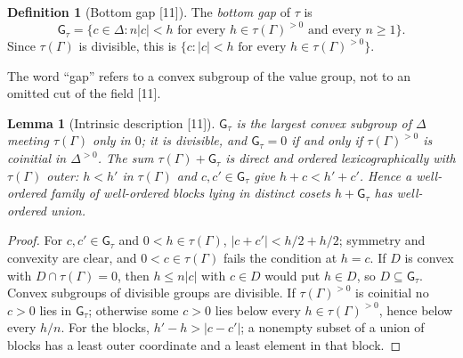 \documentclass[11pt,oneside]{article}
\numberwithin{equation}{section}
\newtheorem{lemma}[lemma]{Lemma}
\theoremstyle{definition}
\newtheorem{definition}[definition]{Definition}
\theoremstyle{remark}
\newcommand{\src}[1]{\textup{\textsf{\small[#1]}}}
\newcommand{\gap}{\mathsf G}
\begin{document}
\begin{definition}[Bottom gap \src{11}]\label{opa:as:def:gap}
The \emph{bottom gap} of $\tau$ is
\[
 \gap_\tau=\{c\in\Delta:n|c|<h\text{ for every }h\in\tau(\Gamma)^{>0}\text{ and every }n\ge1\}.
\]
Since $\tau(\Gamma)$ is divisible, this is $\{c:|c|<h\text{ for every }h\in\tau(\Gamma)^{>0}\}$.
\end{definition}

The word ``gap'' refers to a convex subgroup of the value group, not to an omitted cut of the
field \src{11}.

\begin{lemma}[Intrinsic description \src{11}]\label{opa:as:lem:gap}
$\gap_\tau$ is the largest convex subgroup of $\Delta$ meeting $\tau(\Gamma)$ only in $0$; it is
divisible, and $\gap_\tau=0$ if and only if $\tau(\Gamma)^{>0}$ is coinitial in $\Delta^{>0}$.
The sum $\tau(\Gamma)+\gap_\tau$ is direct and ordered lexicographically with $\tau(\Gamma)$
outer: $h<h'$ in $\tau(\Gamma)$ and $c,c'\in\gap_\tau$ give $h+c<h'+c'$. Hence a well-ordered
family of well-ordered blocks lying in distinct cosets $h+\gap_\tau$ has well-ordered union.
\end{lemma}
\begin{proof}
For $c,c'\in\gap_\tau$ and $0<h\in\tau(\Gamma)$, $|c+c'|<h/2+h/2$; symmetry and convexity are
clear, and $0<c\in\tau(\Gamma)$ fails the condition at $h=c$. If $D$ is convex with
$D\cap\tau(\Gamma)=0$, then $h\le n|c|$ with $c\in D$ would put $h\in D$, so $D\subseteq\gap_\tau$.
Convex subgroups of divisible groups are divisible. If $\tau(\Gamma)^{>0}$ is coinitial no
$c>0$ lies in $\gap_\tau$; otherwise some $c>0$ lies below every $h\in\tau(\Gamma)^{>0}$, hence
below every $h/n$. For the blocks, $h'-h>|c-c'|$; a nonempty subset of a union of blocks has a
least outer coordinate and a least element in that block.
\end{proof}
\end{document}
